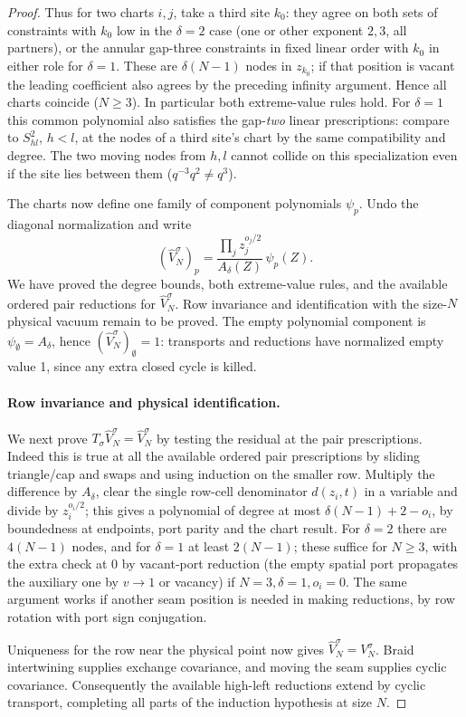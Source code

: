 \documentclass[11pt]{article}
\numberwithin{equation}{section}
\theoremstyle{definition}\newtheorem{definition}[theorem]{Definition}
\theoremstyle{remark}\newtheorem{remark}[theorem]{Remark}
\begin{document}
\begin{proof}
Thus for two charts \(i,j\), take a third site \(k_0\): they agree on both sets of constraints with \(k_0\) low in the \(\delta=2\) case (one or other exponent \(2,3\), all partners), or the annular gap-three constraints in fixed linear order with \(k_0\) in either role for \(\delta=1\). These are \(\delta(N-1)\) nodes in \(z_{k_0}\); if that position is vacant the leading coefficient also agrees by the preceding infinity argument. Hence all charts coincide (\(N\ge3\)). In particular both extreme-value rules hold. For \(\delta=1\) this common polynomial also satisfies the gap-\emph{two} linear prescriptions: compare to \(S_{hl}^2\), \(h<l\), at the nodes of a third site's chart by the same compatibility and degree. The two moving nodes from \(h,l\) cannot collide on this specialization even if the site lies between them (\(q^{-3}q^2\ne q^3\)).

The charts now define one family of component polynomials $\psi_p$.
Undo the diagonal normalization and write
\[
 (\widehat V_N^\sigma)_p
 =\frac{\prod_j z_j^{o_j/2}}{A_\delta(Z)}\,\psi_p(Z).
\]
We have proved the degree bounds, both extreme-value rules, and the
available ordered pair reductions for $\widehat V_N^\sigma$. Row invariance and identification with the size-$N$ physical vacuum remain
to be proved.
The empty polynomial component is \(\psi_\emptyset=A_\delta\), hence \((\widehat V_N^\sigma)_\emptyset=1\): transports and reductions have normalized empty value 1, since any extra closed cycle is killed.

\paragraph{Row invariance and physical identification.}
We next prove $T_\sigma\widehat V_N^\sigma=\widehat V_N^\sigma$ by testing
the residual at the pair prescriptions. Indeed this is true at all the available ordered pair prescriptions by sliding triangle/cap and swaps and using induction on the smaller row. Multiply the difference by \(A_\delta\), clear the single row-cell denominator \(d(z_i,t)\) in a variable and divide by \(z_i^{o_i/2}\); this gives a polynomial of degree at most \(\delta(N-1)+2-o_i\), by boundedness at endpoints, port parity and the chart result. For \(\delta=2\) there are \(4(N-1)\) nodes, and for \(\delta=1\) at least \(2(N-1)\); these suffice for \(N\ge3\), with the extra check at 0 by vacant-port reduction (the empty spatial port propagates the auxiliary one by \(v\to1\) or vacancy) if \(N=3,\delta=1,o_i=0\). The same argument works if another seam position is needed in making reductions, by row rotation with port sign conjugation.

Uniqueness for the row near the physical point now gives
$\widehat V_N^\sigma=V_N^\sigma$. Braid intertwining supplies exchange
covariance, and moving the seam supplies cyclic covariance. Consequently
the available high-left reductions extend by cyclic transport, completing
all parts of the induction hypothesis at size $N$.
\end{proof}
\end{document}
